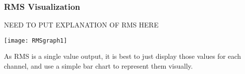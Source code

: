 \subsubsection{RMS Visualization}
NEED TO PUT EXPLANATION OF RMS HERE

\begin{center}
  \texttt{[image: RMSgraph1]} \\[12pt]
\end{center}
As RMS is a single value output, it is best to just display those values for each channel, and use a simple bar chart to represent them visually.
